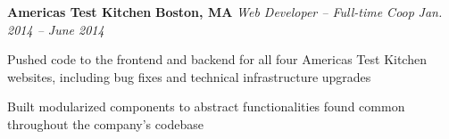 \item
\headerrow
{\textbf{Americas Test Kitchen}}
{\textbf{Boston, MA}}
\headerrow
{\emph{Web Developer -- Full-time Coop}}
{\emph{Jan. 2014 -- June 2014}}
\begin{itemize*}
    \item Pushed code to the frontend and backend for all four Americas Test
    Kitchen websites, including bug fixes and technical infrastructure
    upgrades
    \item Built modularized components to abstract functionalities found common
    throughout the company's codebase
\end{itemize*}

